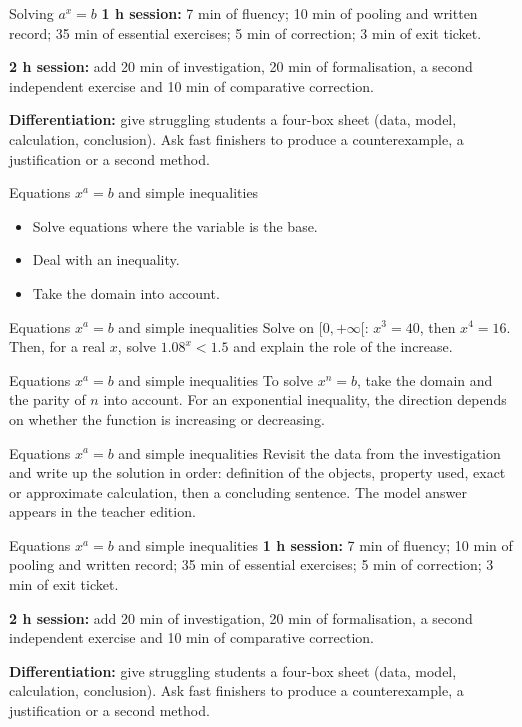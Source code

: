 \documentclass[aspectratio=169,10pt]{beamer}
\begin{document}
\begin{frame}{Solving \(a^x=b\)}
\textbf{1 h session:} 7 min of fluency; 10 min of pooling and written record; 35 min of essential exercises; 5 min of correction; 3 min of exit ticket.

\textbf{2 h session:} add 20 min of investigation, 20 min of formalisation, a second independent exercise and 10 min of comparative correction.

\textbf{Differentiation:} give struggling students a four-box sheet (data, model, calculation, conclusion). Ask fast finishers to produce a counterexample, a justification or a second method.
\end{frame}
\begin{frame}{Equations \(x^a=b\) and simple inequalities}
\begin{itemize}
\item Solve equations where the variable is the base.
\item Deal with an inequality.
\item Take the domain into account.

\end{itemize}
\end{frame}
\begin{frame}{Equations \(x^a=b\) and simple inequalities}
Solve on \([0,+\infty[\): \(x^3=40\), then \(x^4=16\). Then, for a real \(x\), solve \(1.08^x<1.5\) and explain the role of the increase.
\end{frame}
\begin{frame}{Equations \(x^a=b\) and simple inequalities}
To solve \(x^n=b\), take the domain and the parity of \(n\) into account. For an exponential inequality, the direction depends on whether the function is increasing or decreasing.
\end{frame}
\begin{frame}{Equations \(x^a=b\) and simple inequalities}
Revisit the data from the investigation and write up the solution in order: definition of the objects, property used, exact or approximate calculation, then a concluding sentence. The model answer appears in the teacher edition.
\end{frame}
\begin{frame}{Equations \(x^a=b\) and simple inequalities}
\textbf{1 h session:} 7 min of fluency; 10 min of pooling and written record; 35 min of essential exercises; 5 min of correction; 3 min of exit ticket.

\textbf{2 h session:} add 20 min of investigation, 20 min of formalisation, a second independent exercise and 10 min of comparative correction.

\textbf{Differentiation:} give struggling students a four-box sheet (data, model, calculation, conclusion). Ask fast finishers to produce a counterexample, a justification or a second method.
\end{frame}
\end{document}
